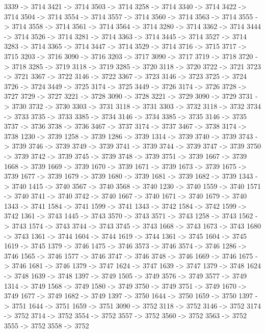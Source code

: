 {	3339 -> 3714
	3421 -> 3714
	3503 -> 3714
	3258 -> 3714
	3340 -> 3714
	3422 -> 3714
	3504 -> 3714
	3554 -> 3714
	3557 -> 3714
	3560 -> 3714
	3563 -> 3714
	3555 -> 3714
	3558 -> 3714
	3561 -> 3714
	3564 -> 3714
	3280 -> 3714
	3362 -> 3714
	3444 -> 3714
	3526 -> 3714
	3281 -> 3714
	3363 -> 3714
	3445 -> 3714
	3527 -> 3714
	3283 -> 3714
	3365 -> 3714
	3447 -> 3714
	3529 -> 3714
	3716 -> 3715
	3717 -> 3715
	3203 -> 3716
	3090 -> 3716
	3203 -> 3717
	3090 -> 3717
	3719 -> 3718
	3720 -> 3718
	3285 -> 3719
	3118 -> 3719
	3285 -> 3720
	3118 -> 3720
	3722 -> 3721
	3723 -> 3721
	3367 -> 3722
	3146 -> 3722
	3367 -> 3723
	3146 -> 3723
	3725 -> 3724
	3726 -> 3724
	3449 -> 3725
	3174 -> 3725
	3449 -> 3726
	3174 -> 3726
	3728 -> 3727
	3729 -> 3727
	3221 -> 3728
	3090 -> 3728
	3221 -> 3729
	3090 -> 3729
	3731 -> 3730
	3732 -> 3730
	3303 -> 3731
	3118 -> 3731
	3303 -> 3732
	3118 -> 3732
	3734 -> 3733
	3735 -> 3733
	3385 -> 3734
	3146 -> 3734
	3385 -> 3735
	3146 -> 3735
	3737 -> 3736
	3738 -> 3736
	3467 -> 3737
	3174 -> 3737
	3467 -> 3738
	3174 -> 3738
	1230 -> 3739
	1258 -> 3739
	1286 -> 3739
	1314 -> 3739
	3740 -> 3739
	3743 -> 3739
	3746 -> 3739
	3749 -> 3739
	3741 -> 3739
	3744 -> 3739
	3747 -> 3739
	3750 -> 3739
	3742 -> 3739
	3745 -> 3739
	3748 -> 3739
	3751 -> 3739
	1667 -> 3739
	1668 -> 3739
	1669 -> 3739
	1670 -> 3739
	1671 -> 3739
	1673 -> 3739
	1675 -> 3739
	1677 -> 3739
	1679 -> 3739
	1680 -> 3739
	1681 -> 3739
	1682 -> 3739
	1343 -> 3740
	1415 -> 3740
	3567 -> 3740
	3568 -> 3740
	1230 -> 3740
	1559 -> 3740
	1571 -> 3740
	3741 -> 3740
	3742 -> 3740
	1667 -> 3740
	1671 -> 3740
	1679 -> 3740
	1343 -> 3741
	1584 -> 3741
	1599 -> 3741
	1343 -> 3742
	1584 -> 3742
	1599 -> 3742
	1361 -> 3743
	1445 -> 3743
	3570 -> 3743
	3571 -> 3743
	1258 -> 3743
	1562 -> 3743
	1574 -> 3743
	3744 -> 3743
	3745 -> 3743
	1668 -> 3743
	1673 -> 3743
	1680 -> 3743
	1361 -> 3744
	1604 -> 3744
	1619 -> 3744
	1361 -> 3745
	1604 -> 3745
	1619 -> 3745
	1379 -> 3746
	1475 -> 3746
	3573 -> 3746
	3574 -> 3746
	1286 -> 3746
	1565 -> 3746
	1577 -> 3746
	3747 -> 3746
	3748 -> 3746
	1669 -> 3746
	1675 -> 3746
	1681 -> 3746
	1379 -> 3747
	1624 -> 3747
	1639 -> 3747
	1379 -> 3748
	1624 -> 3748
	1639 -> 3748
	1397 -> 3749
	1505 -> 3749
	3576 -> 3749
	3577 -> 3749
	1314 -> 3749
	1568 -> 3749
	1580 -> 3749
	3750 -> 3749
	3751 -> 3749
	1670 -> 3749
	1677 -> 3749
	1682 -> 3749
	1397 -> 3750
	1644 -> 3750
	1659 -> 3750
	1397 -> 3751
	1644 -> 3751
	1659 -> 3751
	3090 -> 3752
	3118 -> 3752
	3146 -> 3752
	3174 -> 3752
	3714 -> 3752
	3554 -> 3752
	3557 -> 3752
	3560 -> 3752
	3563 -> 3752
	3555 -> 3752
	3558 -> 3752
}
